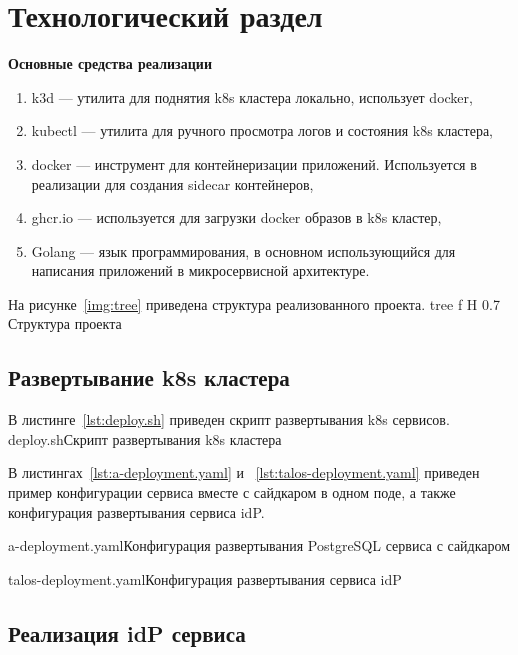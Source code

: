 \chapter{Технологический раздел}

\textbf{Основные средства реализации}
\begin{enumerate}
\item k3d --- утилита для поднятия k8s кластера локально, использует docker, %
\item kubectl --- утилита для ручного просмотра логов и состояния k8s кластера,
\item docker --- инструмент для контейнеризации приложений. Используется в реализации для создания sidecar контейнеров,
\item ghcr.io --- используется для загрузки docker образов в k8s кластер,
\item Golang --- язык программирования, в основном использующийся для написания приложений в микросервисной архитектуре. %
\end{enumerate}

На рисунке~\ref{img:tree} приведена структура реализованного проекта.
    {tree}
    {f}
    {H}
    {0.7\textwidth}
    {Структура проекта}


\section{Развертывание k8s кластера}
В листинге~\ref{lst:deploy.sh} приведен скрипт развертывания k8s сервисов. 
	{deploy.sh}{Скрипт развертывания k8s кластера}

В листингах~\ref{lst:a-deployment.yaml} и ~\ref{lst:talos-deployment.yaml} приведен пример  конфигурации сервиса вместе с сайдкаром в одном поде, а также конфигурация развертывания сервиса idP. 

	{a-deployment.yaml}{Конфигурация развертывания PostgreSQL сервиса с сайдкаром}

	{talos-deployment.yaml}{Конфигурация развертывания сервиса idP}

\section{Реализация idP сервиса}

